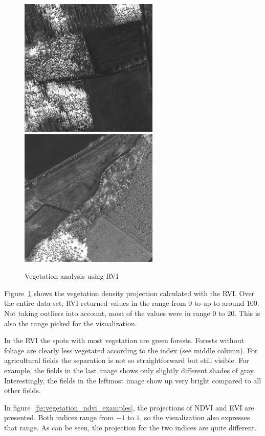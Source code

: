 \begin{figure}
    \includegraphics[width=\VegetationIndicesImageWidth]{images/vegetation/rvi/4} \hfill
    \includegraphics[width=\VegetationIndicesImageWidth]{images/vegetation/rvi/5}

    \caption{Vegetation analysis using RVI}
    \label{fig:vegetation_rvi_examples}
\end{figure}

Figure~\ref{fig:vegetation_rvi_examples} shows the vegetation density projection calculated with the RVI. Over the entire data set, RVI returned values in the range from $0$ to up to around $100$. Not taking outliers into account, most of the values were in range $0$ to $20$. This is also the range picked for the visualization. 

In the RVI the spots with most vegetation are green forests. Forests without foliage are clearly less vegetated according to the index (see middle column). For agricultural fields the separation is not so straightforward but still visible. For example, the fields in the last image shows only slightly different shades of gray. Interestingly, the fields in the leftmost image show up very bright compared to all other fields. 

In figure~\ref{fig:vegetation_ndvi_examples}, the projections of NDVI and EVI are presented. Both indices range from $-1$ to $1$, so the visualization also expresses that range. As can be seen, the projection for the two indices are quite different. 

